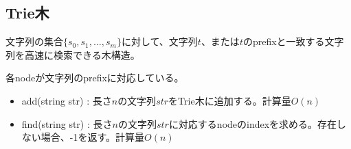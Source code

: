 \subsection{Trie木}

文字列の集合$\{s_0, s_1, \ldots, s_m \}$に対して、文字列$t$、または$t$のprefixと一致する文字列を高速に検索できる木構造。

各nodeが文字列のprefixに対応している。

\begin{itemize}
    \item add(string str) : 長さ$n$の文字列$\mathit{str}$をTrie木に追加する。計算量$O(n)$
    \item find(string str) : 長さ$n$の文字列$\mathit{str}$に対応するnodeのindexを求める。存在しない場合、-1を返す。計算量$O(n)$
\end{itemize}

